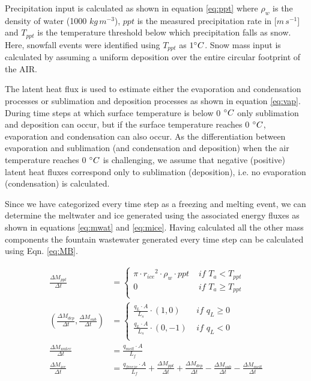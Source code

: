 \documentclass[utf8]{frontiersSCNS} %
\begin{document}
Precipitation input is calculated as shown in equation \ref{eq:ppt} where $\rho_{w}$ is the density of water (1000
$kg\,m^{-3}$), $ppt$ is the measured precipitation rate in [$m\,s^{-1}$] and $T_{ppt}$ is the temperature threshold
below which precipitation falls as snow. Here, snowfall events were identified using $T_{ppt}$ as $1 \degree C$. Snow
mass input is calculated by assuming a uniform deposition over the entire circular footprint of the AIR.

The latent heat flux is used to estimate either the evaporation and condensation processes or sublimation and deposition
processes as shown in equation \ref{eq:vap}. During time steps at which surface temperature is below 0 $\degree C$ only
sublimation and deposition can occur, but if the surface temperature reaches 0 $\degree C$, evaporation and condensation
can also occur. As the differentiation between evaporation and sublimation (and condensation and deposition) when the
air temperature reaches 0 $\degree C$ is challenging, we assume that negative (positive) latent heat fluxes correspond
only to sublimation (deposition), i.e. no evaporation (condensation) is calculated.

Since we have categorized every time step as a freezing and melting event, we can determine the meltwater and  ice
generated using the associated energy fluxes as shown in equations \ref{eq:mwat} and \ref{eq:mice}. Having calculated
all the other mass components the fountain wastewater generated every time step can be calculated using Eqn.
\ref{eq:MB}.

\begin{subequations}
	\label{equations}
	\begin{align}
		\label{eq:ppt}
		\frac{\Delta M_{ppt}}{\Delta t}                                    & = \left\{ \begin{array}{ll} \pi \cdot {r_{ice}}^2 \cdot
			\rho_{w}\cdot ppt & \textit{ if } T_{a} < T_{ppt} \\ 0 & \textit{ if } T_{a} \geq T_{ppt} \\\end{array} \right.                                      \\
		\label{eq:vap}
		(\frac{\Delta M_{dep}}{\Delta t}, \frac{\Delta M_{sub}}{\Delta t}) & = \left\{ \begin{array}{ll} \frac{q_{L}
			\cdot A}{L_s}\cdot (1,0)  & \textit{ if } q_{L} \geq 0 \\ \frac{q_{L}
			\cdot A}{L_s}\cdot (0,-1) & \textit{ if } q_{L} < 0    \\\end{array} \right.                                      \\
		\label{eq:mwat}
		\frac{\Delta M_{water}}{\Delta t}                                  & = \frac{q_{melt} \cdot A }{L_f}                                                   \\
		\label{eq:mice}
		\frac{\Delta M_{ice}}{\Delta t}                                    & = \frac{q_{freeze}\cdot A }{L_f} + \frac{\Delta M_{ppt}}{\Delta t} + \frac{\Delta
			M_{dep}}{\Delta t}- \frac{\Delta M_{sub}}{\Delta t}- \frac{\Delta M_{melt}}{\Delta t}
	\end{align}
\end{subequations}
\end{document}
